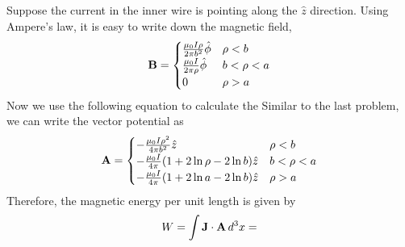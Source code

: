 \documentclass[12pt]{article}
\newcommand{\B}{{\bf B}}
\newcommand{\bJ}{{\bf J}}
\newcommand{\A}{{\bf A}}
\begin{document}
\newpage
{} Suppose the current in the inner wire is pointing along the $\hat{z}$ direction. Using Ampere's law, it is easy to write down the magnetic field,
\begin{equation}
    \B = \begin{cases}
        \frac{\mu_0 I \rho}{2\pi b^2} \hat{\phi} & \rho < b\\
        \frac{\mu_0 I}{2\pi \rho} \hat{\phi}& b < \rho < a\\
        0 & \rho > a
    \end{cases}
\end{equation}
Now we use the following equation to calculate the 
Similar to the last problem, we can write the vector potential as
\begin{equation}
    \A = \begin{cases}
        - \frac{\mu_0 I \rho^2}{4\pi b^2} \hat{z} & \rho < b\\
        -\frac{\mu_0 I}{4\pi} (1 + 2 \ln \rho - 2\ln b)\hat{z} & b < \rho < a\\
        -\frac{\mu_0 I}{4\pi} (1 + 2 \ln a - 2 \ln b) \hat{z}& \rho >a
    \end{cases}
\end{equation}
Therefore, the magnetic energy per unit length is given by
\begin{equation}
    W = \int \bJ \cdot \A \,d^3 x = 
\end{equation}
\end{document}
